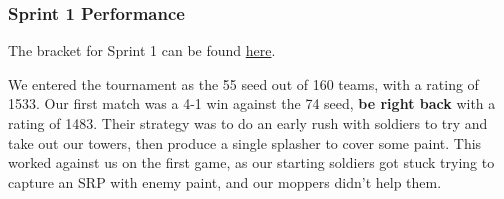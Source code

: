 \subsubsection{Sprint 1 Performance}

The bracket for Sprint 1 can be found \href{https://challonge.com/bc25javasprint1}{here}.

\medskip

We entered the tournament as the 55 seed out of 160 teams, with a rating of 1533. Our first match was a 4-1 win against the 74 seed, \textbf{be right back} with a rating of 1483. Their strategy was to do an early rush with soldiers to try and take out our towers, then produce a single splasher to cover some paint. This worked against us on the first game, as our starting soldiers got stuck trying to capture an SRP with enemy paint, and our moppers didn't help them.

\newpage

